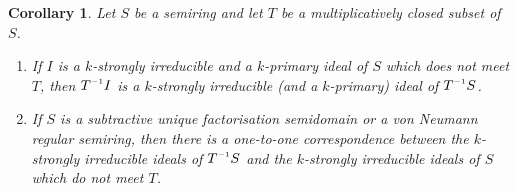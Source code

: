 \documentclass[11pt,leqno]{amsart}
\newcommand{\inv}{^{\raisebox{.2ex}{$\scriptscriptstyle-1$}}}
\newtheorem{corollary}[theorem]{Corollary}
\theoremstyle{definition}
\numberwithin{equation}{section}
\begin{document}


\begin{corollary}\label{loc4} %
Let $S$  be a semiring and let $T$ be a multiplicatively closed subset of $S$.

\begin{enumerate}
\item If $I$ is a $k$-strongly irreducible and a $k$-primary ideal of $S$ which does not meet $T$,
then $T\inv I$ is a $k$-strongly irreducible (and a $k$-primary) ideal of $T\inv S$.

\item If $S$ is a subtractive unique factorisation semidomain or a von Neumann regular semiring, then there is a one-to-one correspondence between the $k$-strongly irreducible ideals of $T\inv S$ and the
$k$-strongly irreducible ideals of $S$ which do not meet $T$.
\end{enumerate}
\end{corollary}
\end{document}
